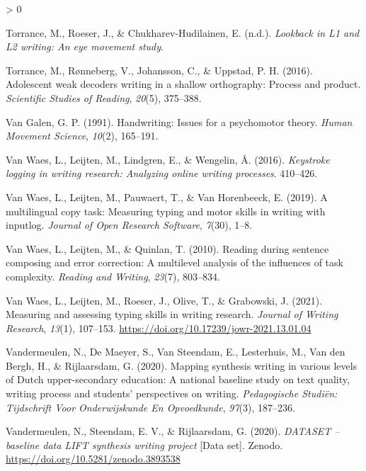 \documentclass[
  english,
  man,floatsintext]{apa7}
\newlength{\cslhangindent}
\newenvironment{CSLReferences}[2] %
 {%
  \setlength{\parindent}{0pt}
  \ifodd #1 \everypar{\setlength{\hangindent}{\cslhangindent}}\ignorespaces\fi
  \ifnum #2 > 0
  \setlength{\parskip}{#2\baselineskip}
  \fi
 }%
 {}
\begin{document}
\begin{CSLReferences}{1}{0}
\leavevmode\hypertarget{ref-torrancea}{}%
Torrance, M., Roeser, J., \& Chukharev-Hudilainen, E. (n.d.). \emph{Lookback in {L1 and L2} writing: An eye movement study}.

\leavevmode\hypertarget{ref-torrance2016adolescent}{}%
Torrance, M., Rønneberg, V., Johansson, C., \& Uppstad, P. H. (2016). Adolescent weak decoders writing in a shallow orthography: Process and product. \emph{Scientific Studies of Reading}, \emph{20}(5), 375--388.

\leavevmode\hypertarget{ref-van1991handwriting}{}%
Van Galen, G. P. (1991). Handwriting: Issues for a psychomotor theory. \emph{Human Movement Science}, \emph{10}(2), 165--191.

\leavevmode\hypertarget{ref-van2016keystroke}{}%
Van Waes, L., Leijten, M., Lindgren, E., \& Wengelin, Å. (2016). \emph{Keystroke logging in writing research: Analyzing online writing processes}. 410--426.

\leavevmode\hypertarget{ref-van2019multilingual}{}%
Van Waes, L., Leijten, M., Pauwaert, T., \& Van Horenbeeck, E. (2019). A multilingual copy task: Measuring typing and motor skills in writing with inputlog. \emph{Journal of Open Research Software}, \emph{7}(30), 1--8.

\leavevmode\hypertarget{ref-van2010reading}{}%
Van Waes, L., Leijten, M., \& Quinlan, T. (2010). Reading during sentence composing and error correction: A multilevel analysis of the influences of task complexity. \emph{Reading and Writing}, \emph{23}(7), 803--834.

\leavevmode\hypertarget{ref-waes2019}{}%
Van Waes, L., Leijten, M., Roeser, J., Olive, T., \& Grabowski, J. (2021). Measuring and assessing typing skills in writing research. \emph{Journal of Writing Research}, \emph{13}(1), 107--153. \url{https://doi.org/10.17239/jowr-2021.13.01.04}

\leavevmode\hypertarget{ref-vandermeulen2020mapping}{}%
Vandermeulen, N., De Maeyer, S., Van Steendam, E., Lesterhuis, M., Van den Bergh, H., \& Rijlaarsdam, G. (2020). Mapping synthesis writing in various levels of {Dutch} upper-secondary education: A national baseline study on text quality, writing process and students' perspectives on writing. \emph{Pedagogische Studiën: Tijdschrift Voor Onderwijskunde En Opvoedkunde}, \emph{97}(3), 187--236.

\leavevmode\hypertarget{ref-vandermeulen2020}{}%
Vandermeulen, N., Steendam, E. V., \& Rijlaarsdam, G. (2020). \emph{{DATASET} -- baseline data {LIFT} synthesis writing project} {[}Data set{]}. Zenodo. \url{https://doi.org/10.5281/zenodo.3893538}


\end{CSLReferences}
\end{document}

